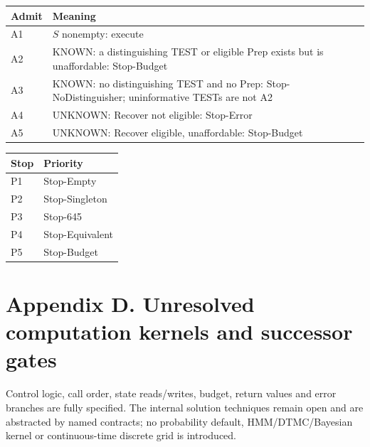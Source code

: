 \begin{table}[H]
\centering
\small
\begin{minipage}[t]{0.48\textwidth}
\begin{tabular}{@{}l p{}@{}}
\hline
Admit & Meaning \\
\hline
A1 & $S$ nonempty: execute \\
A2 & KNOWN: a distinguishing TEST or eligible Prep exists but is unaffordable: Stop-Budget \\
A3 & KNOWN: no distinguishing TEST and no Prep: Stop-NoDistinguisher; uninformative TESTs are not A2 \\
A4 & UNKNOWN: Recover not eligible: Stop-Error \\
A5 & UNKNOWN: Recover eligible, unaffordable: Stop-Budget \\
\hline
\end{tabular}
\end{minipage}\hfill
\begin{minipage}[t]{0.48\textwidth}
\begin{tabular}{@{}l p{}@{}}
\hline
Stop & Priority \\
\hline
P1 & Stop-Empty \\
P2 & Stop-Singleton \\
P3 & Stop-645 \\
P4 & Stop-Equivalent \\
P5 & Stop-Budget \\
\hline
\end{tabular}
\end{minipage}
\end{table}

\section*{Appendix D. Unresolved computation kernels and successor gates}
\label{app:cltav-kernels}

Control logic, call order, state reads/writes, budget, return values and error
branches are fully specified. The internal solution techniques remain open and
are abstracted by named contracts; no probability default, HMM/DTMC/Bayesian
kernel or continuous-time discrete grid is introduced.

